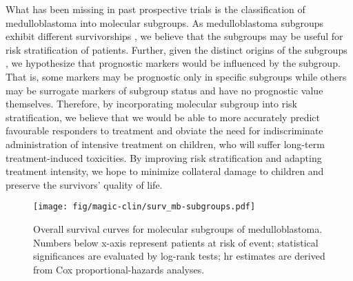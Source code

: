 What has been missing in past prospective trials is the classification of medulloblastoma into molecular subgroups. As medulloblastoma subgroups exhibit different survivorships , we believe that the subgroups may be useful for risk stratification of patients. Further, given the distinct origins of the subgroups , we hypothesize that prognostic markers would be influenced by the subgroup. That is, some markers may be prognostic only in specific subgroups while others may be surrogate markers of subgroup status and have no prognostic value themselves. Therefore, by incorporating molecular subgroup into risk stratification, we believe that we would be able to more accurately predict favourable responders to treatment and obviate the need for indiscriminate administration of intensive treatment on children, who will suffer long-term treatment-induced toxicities. By improving risk stratification and adapting treatment intensity, we hope to minimize collateral damage to children and preserve the survivors' quality of life.

\begin{SCfigure}[5][b]
	\texttt{[image: fig/magic-clin/surv\_mb-subgroups.pdf]}
	\caption[Overall survival curves for molecular subgroups of medulloblastoma]
	{
		Overall survival curves for molecular subgroups of medulloblastoma.
		Numbers below x-axis represent patients at risk of event; statistical significances are evaluated by log-rank tests; \gls{hr} estimates are derived from Cox proportional-hazards analyses.
	}
	\label{fig:surv_mb-subgroups}
\end{SCfigure}

